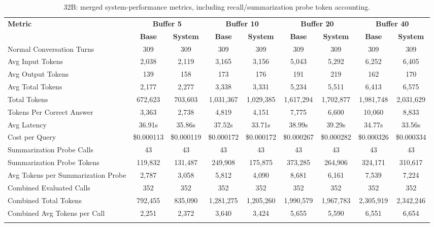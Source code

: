 \begin{table}[htbp]
\caption{32B: merged system-performance metrics, including recall/summarization probe token accounting.}\label{tab:32b_perf_main}
\centering
\tiny
\setlength{\tabcolsep}{2.2pt}
\begin{adjustbox}{width=\textwidth}
\begin{tabular}{lcccccccc}
\toprule
\textbf{Metric} & \multicolumn{2}{c}{\textbf{Buffer 5}} & \multicolumn{2}{c}{\textbf{Buffer 10}} & \multicolumn{2}{c}{\textbf{Buffer 20}} & \multicolumn{2}{c}{\textbf{Buffer 40}} \\
\cmidrule(lr){2-3}\cmidrule(lr){4-5}\cmidrule(lr){6-7}\cmidrule(lr){8-9}
 & \textbf{Base} & \textbf{System} & \textbf{Base} & \textbf{System} & \textbf{Base} & \textbf{System} & \textbf{Base} & \textbf{System} \\
\midrule
Normal Conversation Turns & 309 & 309 & 309 & 309 & 309 & 309 & 309 & 309 \\
Avg Input Tokens & 2,038 & 2,119 & 3,165 & 3,156 & 5,043 & 5,292 & 6,252 & 6,405 \\
Avg Output Tokens & 139 & 158 & 173 & 176 & 191 & 219 & 162 & 170 \\
Avg Total Tokens & 2,177 & 2,277 & 3,338 & 3,331 & 5,234 & 5,511 & 6,413 & 6,575 \\
Total Tokens & 672,623 & 703,603 & 1,031,367 & 1,029,385 & 1,617,294 & 1,702,877 & 1,981,748 & 2,031,629 \\
Tokens Per Correct Answer & 3,363 & 2,738 & 4,819 & 4,151 & 7,775 & 6,600 & 10,060 & 8,833 \\
Avg Latency & 36.91s & 35.86s & 37.52s & 33.71s & 38.99s & 39.29s & 34.77s & 33.56s \\
Cost per Query & \$0.000113 & \$0.000119 & \$0.000172 & \$0.000172 & \$0.000267 & \$0.000282 & \$0.000326 & \$0.000334 \\
Summarization Probe Calls & 43 & 43 & 43 & 43 & 43 & 43 & 43 & 43 \\
Summarization Probe Tokens & 119,832 & 131,487 & 249,908 & 175,875 & 373,285 & 264,906 & 324,171 & 310,617 \\
Avg Tokens per Summarization Probe & 2,787 & 3,058 & 5,812 & 4,090 & 8,681 & 6,161 & 7,539 & 7,224 \\
Combined Evaluated Calls & 352 & 352 & 352 & 352 & 352 & 352 & 352 & 352 \\
Combined Total Tokens & 792,455 & 835,090 & 1,281,275 & 1,205,260 & 1,990,579 & 1,967,783 & 2,305,919 & 2,342,246 \\
Combined Avg Tokens per Call & 2,251 & 2,372 & 3,640 & 3,424 & 5,655 & 5,590 & 6,551 & 6,654 \\
\botrule
\end{tabular}
\end{adjustbox}
\end{table}

